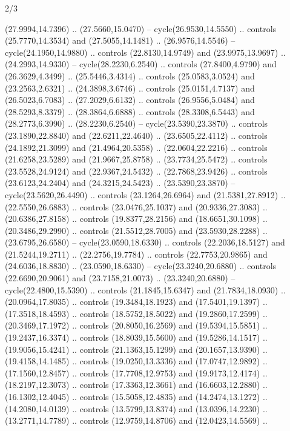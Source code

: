 \begin{flagdescription}{2/3}
\begin{scope}[yshift=\flagwidth,scale=\flagwidth/1241.93737]
\begin{scope}[y=-1mm, x=1mm,draw=gold,fill=blue,line join=miter,miter limit=4,line width=1.8\lw]
\begin{scope}[y=1mm, x=1mm, yscale=-1,shift={(573.68mm+\str,145.75)}]
\begin{scope}[scale=1.35,shift={(-9,-3)}]
\begin{scope}[scale=0.55]
\begin{scope}[scale=1.333]
    (27.9994,14.7396) .. (27.5660,15.0470) -- cycle(26.9530,14.5550) .. controls
    (25.7770,14.3534) and (27.5055,14.1481) .. (26.9576,14.5546) --
    cycle(24.1950,14.9880) .. controls (22.8130,14.9749) and (23.9975,13.9697) ..
    (24.2993,14.9330) -- cycle(28.2230,6.2540) .. controls (27.8400,4.9790) and
    (26.3629,4.3499) .. (25.5446,3.4314) .. controls (25.0583,3.0524) and
    (23.2563,2.6321) .. (24.3898,3.6746) .. controls (25.0151,4.7137) and
    (26.5023,6.7083) .. (27.2029,6.6132) .. controls (26.9556,5.0484) and
    (28.5293,8.3379) .. (28.3864,6.6888) .. controls (28.3308,6.5443) and
    (28.2773,6.3990) .. (28.2230,6.2540) -- cycle(23.5390,23.3870) .. controls
    (23.1890,22.8840) and (22.6211,22.4640) .. (23.6505,22.4112) .. controls
    (24.1892,21.3099) and (21.4964,20.5358) .. (22.0604,22.2216) .. controls
    (21.6258,23.5289) and (21.9667,25.8758) .. (23.7734,25.5472) .. controls
    (23.5528,24.9124) and (22.9367,24.5432) .. (22.7868,23.9426) .. controls
    (23.6123,24.2404) and (24.3215,24.5423) .. (23.5390,23.3870) --
    cycle(23.5620,26.4490) .. controls (23.1264,26.6964) and (21.5381,27.8912) ..
    (22.5550,26.6883) .. controls (23.0476,25.1037) and (20.9336,27.3083) ..
    (20.6386,27.8158) .. controls (19.8377,28.2156) and (18.6651,30.1098) ..
    (20.3486,29.2990) .. controls (21.5512,28.7005) and (23.5930,28.2288) ..
    (23.6795,26.6580) -- cycle(23.0590,18.6330) .. controls (22.2036,18.5127) and
    (21.5244,19.2711) .. (22.2756,19.7784) .. controls (22.7753,20.9865) and
    (24.6036,18.8830) .. (23.0590,18.6330) -- cycle(23.3240,20.6880) .. controls
    (22.6690,20.9061) and (23.7158,21.0073) .. (23.3240,20.6880) --
    cycle(22.4800,15.5390) .. controls (21.1845,15.6347) and (21.7834,18.0930) ..
    (20.0964,17.8035) .. controls (19.3484,18.1923) and (17.5401,19.1397) ..
    (17.3518,18.4593) .. controls (18.5752,18.5022) and (19.2860,17.2599) ..
    (20.3469,17.1972) .. controls (20.8050,16.2569) and (19.5394,15.5851) ..
    (19.2437,16.3374) .. controls (18.8039,15.5600) and (19.5286,14.1517) ..
    (19.9056,15.4241) .. controls (21.1363,15.1299) and (20.1657,13.9390) ..
    (19.4158,14.1485) .. controls (19.0250,13.3336) and (17.0747,12.9892) ..
    (17.1560,12.8457) .. controls (17.7708,12.9753) and (19.9173,12.4174) ..
    (18.2197,12.3073) .. controls (17.3363,12.3661) and (16.6603,12.2880) ..
    (16.1302,12.4045) .. controls (15.5058,12.4835) and (14.2474,13.1272) ..
    (14.2080,14.0139) .. controls (13.5799,13.8374) and (13.0396,14.2230) ..
    (13.2771,14.7789) .. controls (12.9759,14.8706) and (12.0423,14.5569) ..

\end{scope}
\end{scope}
\end{scope}
\end{scope}
\end{scope}
\end{scope}
\end{flagdescription}
